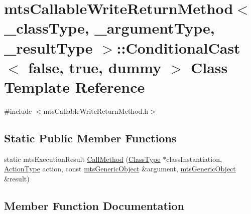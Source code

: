 \hypertarget{classmts_callable_write_return_method_1_1_conditional_cast_3_01false_00_01true_00_01dummy_01_4}{}\section{mts\+Callable\+Write\+Return\+Method$<$ \+\_\+class\+Type, \+\_\+argument\+Type, \+\_\+result\+Type $>$\+:\+:Conditional\+Cast$<$ false, true, dummy $>$ Class Template Reference}
\label{classmts_callable_write_return_method_1_1_conditional_cast_3_01false_00_01true_00_01dummy_01_4}


{\ttfamily \#include $<$mts\+Callable\+Write\+Return\+Method.\+h$>$}

\subsection*{Static Public Member Functions}
\begin{DoxyCompactItemize}
\item 
static mts\+Execution\+Result \hyperlink{classmts_callable_write_return_method_1_1_conditional_cast_3_01false_00_01true_00_01dummy_01_4_ab6c7ca9fca21849c6aa63073ac0d1743}{Call\+Method} (\hyperlink{classmts_callable_write_return_method_a51dbe6298941ab172d83182c8188092d}{Class\+Type} $\ast$class\+Instantiation, \hyperlink{classmts_callable_write_return_method_a650562eae4db20a5cfbbff0f9f7e1a0a}{Action\+Type} action, const \hyperlink{classmts_generic_object}{mts\+Generic\+Object} \&argument, \hyperlink{classmts_generic_object}{mts\+Generic\+Object} \&result)
\end{DoxyCompactItemize}


\subsection{Member Function Documentation}
\hypertarget{classmts_callable_write_return_method_1_1_conditional_cast_3_01false_00_01true_00_01dummy_01_4_ab6c7ca9fca21849c6aa63073ac0d1743}{}

